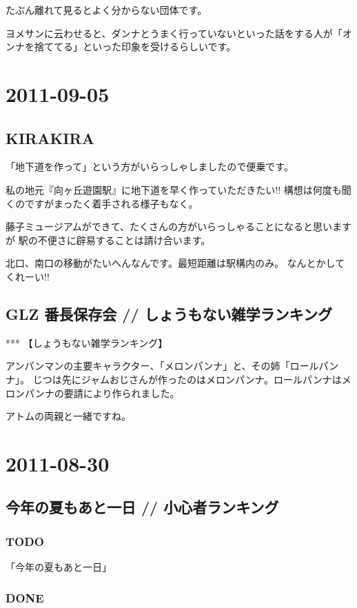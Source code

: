 \documentclass[11pt]{article}
\begin{document}
たぶん離れて見るとよく分からない団体です。

ヨメサンに云わせると、ダンナとうまく行っていないといった話をする人が「オンナを捨ててる」といった印象を受けるらしいです。
\section{2011-09-05}
\label{sec-75}
\subsection{KIRAKIRA}
\label{sec-75_1}

「地下道を作って」という方がいらっしゃしましたので便乗です。

私の地元『向ヶ丘遊園駅』に地下道を早く作っていただきたい!!
構想は何度も聞くのですがまったく着手される様子もなく。

藤子ミュージアムができて、たくさんの方がいらっしゃることになると思いますが
駅の不便さに辟易することは請け合います。

北口、南口の移動がたいへんなんです。最短距離は駅構内のみ。
なんとかしてくれーい!!
\subsection{GLZ 番長保存会 // しょうもない雑学ランキング}
\label{sec-75_2}

***
【しょうもない雑学ランキング】

アンパンマンの主要キャラクター、「メロンパンナ」と、その姉「ロールパンナ」。
じつは先にジャムおじさんが作ったのはメロンパンナ。ロールパンナはメロンパンナの要請により作られました。

アトムの両親と一緒ですね。
\section{2011-08-30}
\label{sec-76}
\subsection{今年の夏もあと一日 // 小心者ランキング}
\label{sec-76_1}
\subsubsection{\textbf{TODO}}
\label{sec-76_1_1}

「今年の夏もあと一日」
\subsubsection{\textbf{DONE}}
\label{sec-76_1_2}
\end{document}
